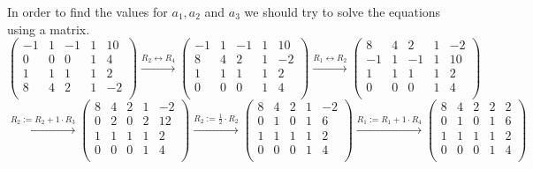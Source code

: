 \documentclass[a4paper]{article}
\begin{document}
In order to find the values for $a_1, a_2$ and $a_3$ we should try to solve the equations using a matrix.
\[
\left(
\begin{array}{cccc|c}
-1  & 1   & -1  & 1 & 10  \\
0   & 0   & 0   & 1 & 4   \\
1   & 1   & 1   & 1 & 2  \\
8   & 4   & 2   & 1 & -2  \\
\end{array}
\right)
\xrightarrow{\text{$R_2 \leftrightarrow R_4$}}
\left(
\begin{array}{cccc|c}
-1  & 1   & -1  & 1 & 10  \\
8   & 4   & 2   & 1 & -2  \\
1   & 1   & 1   & 1 & 2  \\
0   & 0   & 0   & 1 & 4   \\
\end{array}
\right)
\xrightarrow{\text{$R_1 \leftrightarrow R_2$}}
\left(
\begin{array}{cccc|c}
8   & 4   & 2   & 1 & -2  \\
-1  & 1   & -1  & 1 & 10  \\
1   & 1   & 1   & 1 & 2  \\
0   & 0   & 0   & 1 & 4   \\
\end{array}
\right)
\]
\[
\xrightarrow{\text{$R_2 := R_2 + 1 \cdot R_3$}}
\left(
\begin{array}{cccc|c}
8   & 4   & 2   & 1 & -2  \\
0   & 2   & 0   & 2 & 12  \\
1   & 1   & 1   & 1 & 2  \\
0   & 0   & 0   & 1 & 4   \\
\end{array}
\right)
\xrightarrow{\text{$R_2 := \frac{1}{2} \cdot R_2$}}
\left(
\begin{array}{cccc|c}
8   & 4   & 2   & 1 & -2  \\
0   & 1   & 0   & 1 & 6  \\
1   & 1   & 1   & 1 & 2  \\
0   & 0   & 0   & 1 & 4   \\
\end{array}
\right)
\xrightarrow{\text{$R_1 := R_1 + 1 \cdot R_4$}}
\left(
\begin{array}{cccc|c}
8   & 4   & 2   & 2 & 2  \\
0   & 1   & 0   & 1 & 6  \\
1   & 1   & 1   & 1 & 2  \\
0   & 0   & 0   & 1 & 4   \\
\end{array}
\right)
\]
\end{document}

